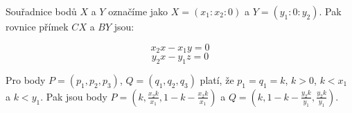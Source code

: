 \documentclass{fkssolpub}
\author{Ondřej Sedláček}
\begin{document}
 

Souřadnice bodů $X$ a $Y$ označíme jako $X = (x_1 : x_2 : 0)$ a $Y = (y_1 : 0 : y_2)$.
Pak rovnice přímek $CX$ a $BY$ jsou:

\[
  x_2 x - x_1 y = 0
\]
\[
  y_2 x - y_1 z = 0
\]

Pro body $P = (p_1, p_2, p_3)$, $Q = (q_1, q_2, q_3)$ platí, že $p_1 = q_1 = k$,
$k > 0$, $k < x_1$ a $k < y_1$. Pak
jsou body $P = \left(k, \frac{x_2 k}{x_1}, 1 - k - \frac{x_2 k}{x_1}\right)$
a $Q = \left(k, 1 - k - \frac{y_2 k}{y_1}, \frac{y_2 k}{y_1}\right)$.

\end{document}

